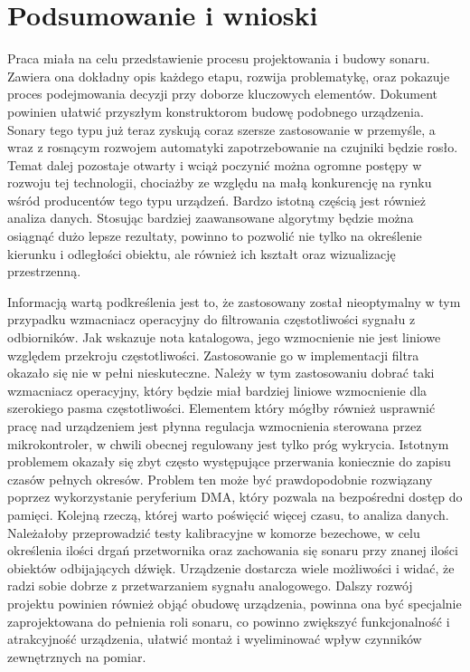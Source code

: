 \chapter[Podsumowanie i wnioski]{Podsumowanie i wnioski}

\label{chapter:wnioski}

Praca miała na celu przedstawienie procesu projektowania i budowy sonaru. Zawiera ona dokładny opis każdego etapu, rozwija problematykę, 
oraz pokazuje proces podejmowania decyzji przy doborze kluczowych elementów. Dokument powinien ułatwić przyszłym konstruktorom budowę podobnego urządzenia.
Sonary tego typu już teraz zyskują coraz szersze zastosowanie w przemyśle, a wraz z rosnącym rozwojem automatyki zapotrzebowanie na czujniki będzie rosło. 
Temat dalej pozostaje otwarty i wciąż poczynić można ogromne postępy w rozwoju tej technologii, chociażby ze względu na małą konkurencję na rynku wśród producentów tego typu urządzeń.
Bardzo istotną częścią jest również analiza danych. Stosując bardziej zaawansowane algorytmy będzie można osiągnąć dużo lepsze rezultaty, 
powinno to pozwolić nie tylko na określenie kierunku i odległości obiektu, ale również ich kształt oraz wizualizację przestrzenną.

Informacją wartą podkreślenia jest to, że zastosowany został nieoptymalny w tym przypadku wzmacniacz operacyjny do filtrowania częstotliwości sygnału z odbiorników. 
Jak wskazuje nota katalogowa, jego wzmocnienie nie jest liniowe względem przekroju częstotliwości. 
Zastosowanie go w implementacji filtra okazało się nie w pełni nieskuteczne. Należy w tym zastosowaniu dobrać taki wzmacniacz operacyjny, 
który będzie miał bardziej liniowe wzmocnienie dla szerokiego pasma częstotliwości. 
Elementem który mógłby również usprawnić pracę nad urządzeniem jest płynna regulacja wzmocnienia sterowana przez mikrokontroler, 
w chwili obecnej regulowany jest tylko próg wykrycia.
Istotnym problemem okazały się zbyt często występujące przerwania koniecznie do zapisu czasów pełnych okresów. 
Problem ten może być prawdopodobnie rozwiązany poprzez wykorzystanie peryferium DMA, który pozwala na bezpośredni dostęp do pamięci.
Kolejną rzeczą, której warto poświęcić więcej czasu, to analiza danych. Należałoby przeprowadzić testy kalibracyjne w komorze bezechowe, 
w celu określenia ilości drgań przetwornika oraz zachowania się sonaru przy znanej ilości obiektów odbijających dźwięk.
Urządzenie dostarcza wiele możliwości i widać, że radzi sobie dobrze z przetwarzaniem sygnału analogowego. 
Dalszy rozwój projektu powinien również objąć obudowę urządzenia, powinna ona być specjalnie zaprojektowana do pełnienia roli sonaru, 
co powinno zwiększyć funkcjonalność i atrakcyjność urządzenia, ułatwić montaż i wyeliminować wpływ czynników zewnętrznych na pomiar. 

\nocite{roberto}